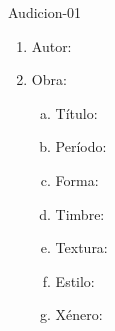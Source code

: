 \begin{defproblem}{Audicion-01}
\begin{multicols}{2}
\begin{ejercicio}[]
	\begin{enumerate}[1.-]
        \vspace*{0.3cm}
		\item
			Autor: \dotfill
			\vspace*{0.3cm}
		\item
			Obra:
			\begin{enumerate}[a)]
			    \item Título: \dotfill \vspace*{0.3cm}
			    \item Período: \dotfill \vspace*{0.3cm}
			    \item Forma: \dotfill \vspace*{0.3cm}
			    \item Timbre: \dotfill \vspace*{0.3cm} 		
			    \item Textura: \dotfill \vspace*{0.3cm}
			    \item Estilo: \dotfill \vspace*{0.3cm}
			    \item Xénero: \dotfill \vspace*{0.3cm}
			\end{enumerate}
			\vspace*{2.0cm}			
	\end{enumerate}
\end{ejercicio}
\end{multicols}
\end{defproblem}